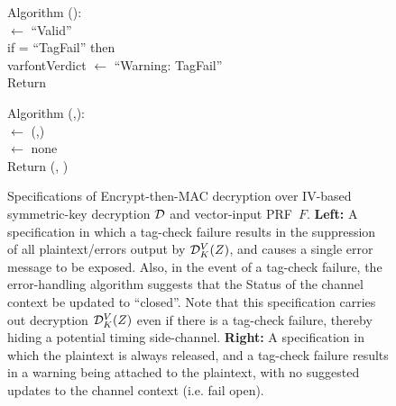 \begin{figure}
{\medskip
Algorithm ():\\
\nudge {} $\gets$ ``Valid''\\
\nudge if  =  ``TagFail'' then \\varfont{Verdict} $\gets$ ``Warning: TagFail''\\
\nudge Return 

\medskip
Algorithm (,):\\
\nudge {} $\gets$ (,)\\
\nudge {} $\gets$ none \\
\nudge Return (, )
} 
\caption{Specifications of Encrypt-then-MAC decryption over IV-based
  symmetric-key decryption $\mathcal{D}$ and vector-input PRF~$F$.   {\bf
    Left:} A specification in which a tag-check failure results in the
suppression of all plaintext/errors output by $\mathcal{D}^V_K(Z)$, and
causes a single error message to be exposed.  Also,
in the event of a tag-check failure, the error-handling algorithm
suggests that the Status of the channel context be updated to
``closed''.  Note that this specification carries out decryption
$\mathcal{D}^V_K(Z)$ even if there is a tag-check failure, thereby hiding a
potential timing side-channel. 
%
{\bf
  Right: } A specification in which the plaintext is always released,
and a tag-check failure results in a warning being attached to the
plaintext, with no suggested updates to the channel context
(i.e. fail open).  %
}
\label{fig:EtM-aead}
\end{figure}
